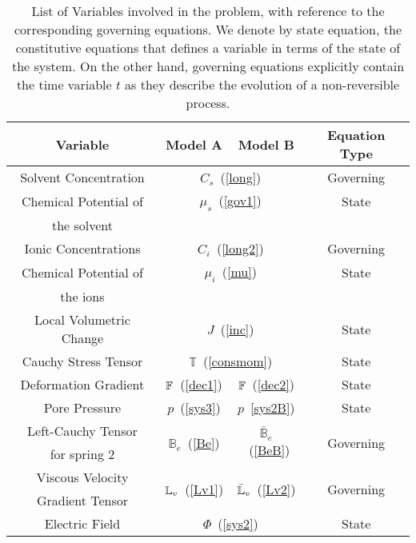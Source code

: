 \vspace{3mm}
\begin{table}
	\centering
	\begin{tabular}{c|c|c|c}
		\hline\addlinespace[2pt]
		Variable &  \hspace{1pt} Model A \hspace{1pt} & \hspace{1pt} Model B\hspace{1pt} & \hspace{4pt}Equation Type\hspace{4pt}\\
		\hline
		\hline\addlinespace[2.5pt]
		Solvent Concentration &  \multicolumn{2}{c|}{$C_s$~(\ref{long})}& Governing \\[2.5pt]
		Chemical Potential of & \multicolumn{2}{c|}{ $\mu_s$~(\ref{gov1})}& State \\
		the solvent &\multicolumn{2}{c|}{}&\\[2pt]
		Ionic Concentrations & \multicolumn{2}{c|}{$C_i$~(\ref{long2})}& Governing \\[3pt]
		Chemical Potential of & \multicolumn{2}{c|}{$\mu_i$~(\ref{mu}) }& State \\
		the ions &\multicolumn{2}{c|}{ }&\\[2pt]
		\hline\addlinespace[2pt]
		Local Volumetric Change & \multicolumn{2}{c|}{$J$~(\ref{inc})}& State \\[2.5pt]
		Cauchy Stress Tensor & 	\multicolumn{2}{c|}{$\mathbb{T}$~(\ref{consmom})}& State \\[2.5pt]
		Deformation Gradient & $\mathbb{F}$~(\ref{dec1})& $\mathbb{F}$~(\ref{dec2})& State \\[2.5pt]
		Pore Pressure & $p$~(\ref{sys3}) & $p$~\ref{sys2B})& State \\[2.5pt]
		Left-Cauchy Tensor& \multirow{2}{*}{$\mathbb{B}_e$~(\ref{Be})} & \multirow{2}{*}{$\mathbb{\bar{B}}_e$~(\ref{BeB})}&\multirow{2}{*}{Governing}\\
		for spring 2&&&\\
		Viscous Velocity & \multirow{2}{*}{$\mathbb{L}_v$~(\ref{Lv1})}&  \multirow{2}{*}{$\bar{\mathbb{L}}_v$~(\ref{Lv2})}&\multirow{2}{*}{Governing }\\
		Gradient Tensor&&&\\
		\hline\addlinespace[2pt]
		Electric Field & \multicolumn{2}{c|}{$\Phi$~(\ref{sys2})}& State \\
		\hline 
		\hline
	\end{tabular}
	\vspace{3mm}
	\caption{List of Variables involved in the problem, with reference to the corresponding governing equations. We denote by state equation, the constitutive equations that defines a variable in terms of the state of the system. On the other hand, governing equations explicitly contain the time variable $t$ as they describe the evolution of a non-reversible process.}
	\label{summary}
\end{table}

